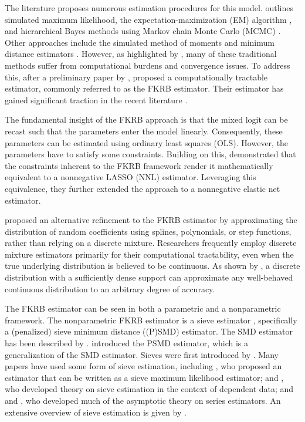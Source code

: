 The literature proposes numerous estimation procedures for this model. 
\citet{Train2009} outlines simulated maximum likelihood, the expectation-maximization (EM) algorithm \citep[further detailed in][]{Train2008}, and hierarchical Bayes methods using Markov chain Monte Carlo (MCMC) \citep[see also][]{BurdaHardingHausman2008,Rossi2012}. 
Other approaches include the simulated method of moments \citep{McFadden1989} and minimum distance estimators \citep{BeranMillar1994}. 
However, as highlighted by \citet{FoxKimRyanBajari2011}, many of these traditional methods suffer from computational burdens and convergence issues. 
To address this, after a preliminary paper by \citet{BajariFoxRyan2007}, \citet{FoxKimRyanBajari2011} proposed a computationally tractable estimator, commonly referred to as the FKRB estimator.
Their estimator has gained significant traction in the recent literature \citep[see for example][]{HoudeMyers2019,BlundellGowrisankaranLanger2020}.

The fundamental insight of the FKRB approach is that the mixed logit can be recast such that the parameters enter the model linearly. 
Consequently, these parameters can be estimated using ordinary least squares (OLS).
However, the parameters have to satisfy some constraints. 
Building on this, \citet{HeissHetzeneckerOsterhaus2022} demonstrated that the constraints inherent to the FKRB framework render it mathematically equivalent to a nonnegative LASSO (NNL) estimator. 
Leveraging this equivalence, they further extended the approach to a nonnegative elastic net estimator.

\citet{Train2016} proposed an alternative refinement to the FKRB estimator by approximating the distribution of random coefficients using splines, polynomials, or step functions, rather than relying on a discrete mixture. 
Researchers frequently employ discrete mixture estimators primarily for their computational tractability, even when the true underlying distribution is believed to be continuous. 
As shown by \citet{McFaddenTrain2000}, a discrete distribution with a sufficiently dense support can approximate any well-behaved continuous distribution to an arbitrary degree of accuracy.

The FKRB estimator can be seen in both a parametric and a nonparametric framework.
The nonparametric FKRB estimator is a sieve estimator \citep{HeissHetzeneckerOsterhaus2022, FoxKimYang2016}, specifically a (penalized) sieve minimum distance ((P)SMD) estimator.
The SMD estimator has been described by \citet{AiChen2003,NeweyPowell2003}.
\citet{ChenPouzo2012} introduced the PSMD estimator, which is a generalization of the SMD estimator.
Sieves were first introduced by \citet{Grenander1981}.
Many papers have used some form of sieve estimation, including \citet{GallantNychka1987}, who proposed an estimator that can be written as a sieve maximum likelihood estimator; \citet{WhiteWooldridge1991} and \citet{ChenShen1998}, who developed theory on sieve estimation in the context of dependent data; and \citet{Andrews1991} and \citet{Newey1997}, who developed much of the asymptotic theory on series estimators.
An extensive overview of sieve estimation is given by \citet{Chen2007}.

